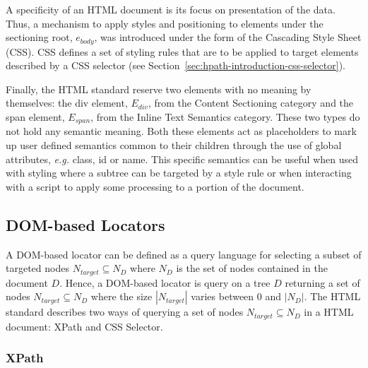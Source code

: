 A specificity of an HTML document is its focus on presentation of the data. Thus, a mechanism to apply styles and positioning to elements under the sectioning root, $e_{body}$, was introduced under the form of the Cascading Style Sheet (CSS). CSS defines a set of styling rules that are to be applied to target elements described by a CSS selector (see Section~\ref{sec:hpath-introduction-css-selector}).

Finally, the HTML standard reserve two elements with no meaning by themselves: the div element, $E_{div}$, from the Content Sectioning category and the span element, $E_{span}$, from the Inline Text Semantics category. These two types do not hold any semantic meaning. Both these elements act as placeholders to mark up user defined semantics common to their children through the use of global attributes, \emph{e.g.} class, id or name. This specific semantics can be useful when used with styling where a subtree can be targeted by a style rule or when interacting with a script to apply some processing to a portion of the document.

\subsection{DOM-based Locators}
\label{sec:hpath-introduction-locators}

A DOM-based locator can be defined as a query language for selecting a subset of targeted nodes $N_{target} \subseteq N_D$ where $N_D$ is the set of nodes contained in the document $D$. Hence, a DOM-based locator is query on a tree $D$ returning a set of nodes $N_{target} \subseteq N_D$ where the size $|N_{target}|$ varies between 0 and $|N_D|$. The HTML standard describes two ways of querying a set of nodes $N_{target} \subseteq N_D$ in a HTML document: XPath and CSS Selector. 

\subsubsection{XPath}
\label{sec:hpath-introduction-xpath}

